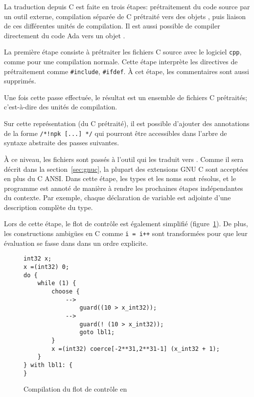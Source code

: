 La traduction depuis C est faite en trois étapes: prétraitement du code source
par un outil externe, compilation séparée de C prétraité vers des objets
\newspeak{}, puis liaison de ces différentes unités de compilation. Il est aussi
possible de compiler directement du code Ada vers un objet \newspeak{}.

La première étape consiste à prétraiter les fichiers C source avec le logiciel
\texttt{cpp}, comme pour une compilation normale. Cette étape interprète les
directives de prétraitement comme \texttt{\#include}, \texttt{\#ifdef}. À cet
étape, les commentaires sont aussi supprimés.

Une fois cette passe effectuée, le résultat est un ensemble de fichiers C
prétraités; c'est-à-dire des unités de compilation.

Sur cette représentation (du C prétraité), il est possible d'ajouter des
annotations de la forme \texttt{/*!npk [...] */} qui pourront être accessibles
dans l'arbre de syntaxe abstraite des passes suivantes.


À ce niveau, les fichiers sont passés à l'outil \ctonewspeak qui les
traduit vers \newspeak. Comme il sera décrit dans la section~\ref{sec:gnuc}, la
plupart des extensions GNU C sont acceptées en plus du C ANSI. Dans cette étape,
les types et les noms sont résolus, et le programme est annoté de manière à
rendre les prochaines étapes indépendantes du contexte. Par exemple, chaque
déclaration de variable est adjointe d'une description complète du type.

Lors de cette étape, le flot de contrôle est également simplifié
(figure~\ref{fig:flot-controle-simple}). De plus, les constructions ambigües en
C comme \texttt{i = i++} sont transformées pour que leur évaluation se fasse
dans dans un ordre explicite.

\begin{figure}[b]

\begin{minipage}{0.25\linewidth}
\end{minipage}
\begin{minipage}{0.7\linewidth}
\begin{Verbatim}
int32 x;
x =(int32) 0;
do {
    while (1) {
        choose {
            -->
                guard((10 > x_int32));
            -->
                guard(! (10 > x_int32));
                goto lbl1;
        }
        x =(int32) coerce[-2**31,2**31-1] (x_int32 + 1);
    }
} with lbl1: {
}
\end{Verbatim}
\end{minipage}

    \caption{Compilation du flot de contrôle en \newspeak}
    \label{fig:flot-controle-simple}
\end{figure}

